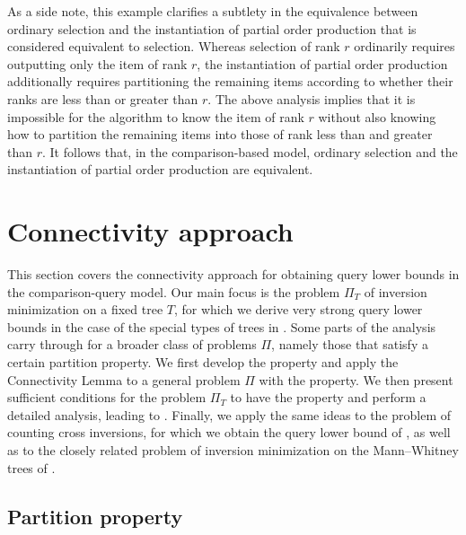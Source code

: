As a side note, this example clarifies a subtlety in the equivalence between ordinary selection and the instantiation of partial order production that is considered equivalent to selection. Whereas selection of rank $r$ ordinarily requires outputting only the item
of rank $r$, the instantiation of partial order production additionally requires partitioning the remaining items according to whether their ranks are less than or greater than $r$. The above analysis implies that it is impossible for the algorithm to know the item of rank $r$ without also knowing how to partition the remaining items into those of rank less than and greater than $r$. It follows that, in the comparison-based model, ordinary selection and the instantiation of partial order production are equivalent. 



\section{Connectivity approach}
\label{sec:connectivity:both}

This section covers the connectivity approach for obtaining query lower bounds in the comparison-query model. Our main focus is the problem $\Pi_T$ of inversion minimization on a fixed tree $T$, for which we derive very strong query lower bounds in the case of the special types of trees in . Some parts of the analysis carry through for a broader class of problems $\Pi$, namely those that satisfy a certain partition property. We first develop the property and apply the Connectivity Lemma to a general
%
problem $\Pi$ with the property. We then present sufficient conditions for the problem $\Pi_T$ to have the property and perform a detailed analysis, leading to . Finally, we apply the same ideas to the problem of counting cross inversions, for which we obtain the query lower bound of , as well as to the closely related problem of inversion minimization on the Mann--Whitney trees of .

\subsection{Partition property}

